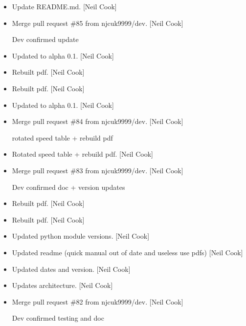 \documentclass[a4paper,10pt,english]{report}
\begin{document}
\label{\detokenize{misc/changelog:id519}}\begin{itemize}
\item {} 
Update README.md. {[}Neil Cook{]}

\item {} 
Merge pull request \#85 from njcuk9999/dev. {[}Neil Cook{]}

Dev \sphinxhyphen{} confirmed update

\item {} 
Updated to alpha 0.1. {[}Neil Cook{]}

\item {} 
Rebuilt pdf. {[}Neil Cook{]}

\item {} 
Rebuilt pdf. {[}Neil Cook{]}

\item {} 
Updated to alpha 0.1. {[}Neil Cook{]}

\item {} 
Merge pull request \#84 from njcuk9999/dev. {[}Neil Cook{]}

rotated speed table + rebuild pdf

\item {} 
Rotated speed table + rebuild pdf. {[}Neil Cook{]}

\item {} 
Merge pull request \#83 from njcuk9999/dev. {[}Neil Cook{]}

Dev \sphinxhyphen{} confirmed doc + version updates

\item {} 
Rebuilt pdf. {[}Neil Cook{]}

\item {} 
Rebuilt pdf. {[}Neil Cook{]}

\item {} 
Updated python module versions. {[}Neil Cook{]}

\item {} 
Updated readme (quick manual out of date and useless \sphinxhyphen{} use pdfs) {[}Neil
Cook{]}

\item {} 
Updated dates and version. {[}Neil Cook{]}

\item {} 
Updates architecture. {[}Neil Cook{]}

\item {} 
Merge pull request \#82 from njcuk9999/dev. {[}Neil Cook{]}

Dev \sphinxhyphen{} confirmed testing and doc


\end{itemize}
\end{document}
